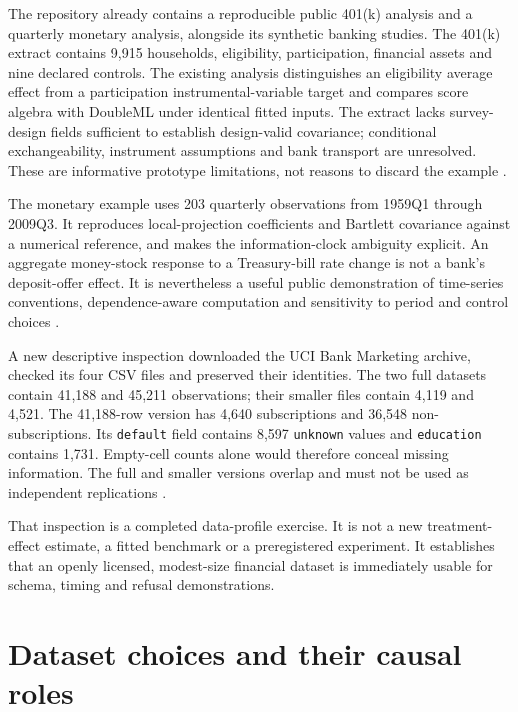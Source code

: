The repository already contains a reproducible public 401(k) analysis
and a quarterly monetary analysis, alongside its synthetic banking
studies. The 401(k) extract contains 9,915 households, eligibility,
participation, financial assets and nine declared controls. The existing
analysis distinguishes an eligibility average effect from a
participation instrumental-variable target and compares score algebra
with DoubleML under identical fitted inputs. The extract lacks
survey-design fields sufficient to establish design-valid covariance;
conditional exchangeability, instrument assumptions and bank transport
are unresolved. These are informative prototype limitations, not reasons
to discard the example \citep{public401k}.

The monetary example uses 203 quarterly observations from 1959Q1 through
2009Q3. It reproduces local-projection coefficients and Bartlett
covariance against a numerical reference, and makes the
information-clock ambiguity explicit. An aggregate money-stock response
to a Treasury-bill rate change is not a bank's deposit-offer effect. It
is nevertheless a useful public demonstration of time-series
conventions, dependence-aware computation and sensitivity to period and
control choices \citep{public_macrodata_dynamic}.

A new descriptive inspection downloaded the UCI Bank Marketing archive,
checked its four CSV files and preserved their identities. The two full
datasets contain 41,188 and 45,211 observations; their smaller files
contain 4,119 and 4,521. The 41,188-row version has 4,640 subscriptions
and 36,548 non-subscriptions. Its \texttt{default} field contains 8,597
\texttt{unknown} values and \texttt{education} contains 1,731.
Empty-cell counts alone would therefore conceal missing information. The
full and smaller versions overlap and must not be used as independent
replications \citep{pd15_uci_bank,pd15_profile}.

That inspection is a completed data-profile exercise. It is not a new
treatment-effect estimate, a fitted benchmark or a preregistered
experiment. It establishes that an openly licensed, modest-size
financial dataset is immediately usable for schema, timing and refusal
demonstrations.

\hypertarget{pd15:datasets}{%
\chapter{Dataset choices and their causal roles}\label{pd15:datasets}}

